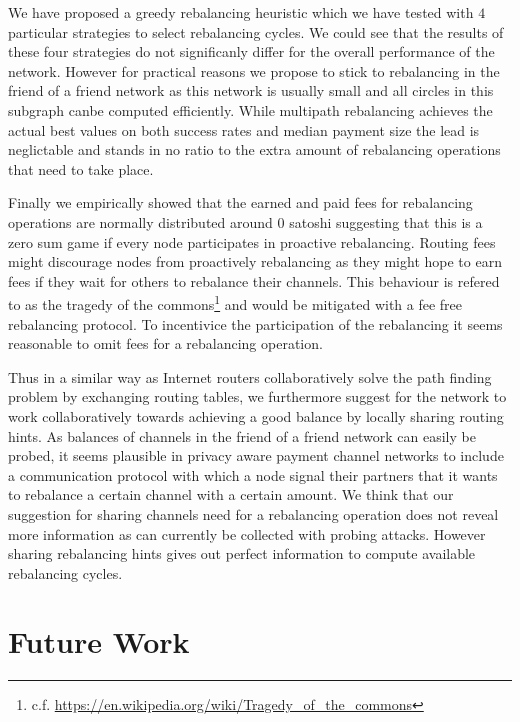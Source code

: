 \documentclass[a4paper]{paper}
\begin{document}
We have proposed a greedy rebalancing heuristic which we have tested with $4$ particular strategies to select rebalancing cycles.
We could see that the results of these four strategies do not significanly differ for the overall performance of the network.
However for practical reasons we propose to stick to rebalancing in the friend of a friend network as this network is usually small and all circles in this subgraph canbe computed efficiently.
While multipath rebalancing achieves the actual best values on both success rates and median payment size the lead is neglictable and stands in no ratio to the extra amount of rebalancing operations that need to take place.

Finally we empirically showed that the earned and paid fees for rebalancing operations are normally distributed around 0 satoshi suggesting that this is a zero sum game if every node participates in proactive rebalancing.
Routing fees might discourage nodes from proactively rebalancing as they might hope to earn fees if they wait for others to rebalance their channels.
This behaviour is refered to as the tragedy of the commons\footnote{c.f. \url{https://en.wikipedia.org/wiki/Tragedy_of_the_commons}} and would be mitigated with a fee free rebalancing protocol.
To incentivice the participation of the rebalancing it seems reasonable to omit fees for a rebalancing operation.

Thus in a similar way as Internet routers collaboratively solve the path finding problem by exchanging routing tables, we furthermore suggest for the network to work collaboratively towards achieving a good balance by locally sharing routing hints. 
As balances of channels in the friend of a friend network can easily be probed, it seems plausible in privacy aware payment channel networks to include a communication protocol with which a node signal their partners that it wants to rebalance a certain channel with a certain amount.
We think that our suggestion for sharing channels need for a rebalancing operation does not reveal more information as can currently be collected with probing attacks.
However sharing rebalancing hints gives out perfect information to compute available rebalancing cycles.

\section{Future Work}
\label{sec:future}
\end{document}
